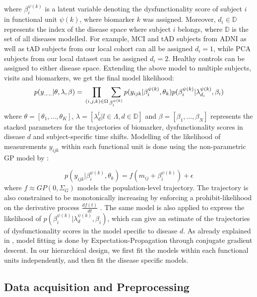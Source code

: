 \documentclass{llncs}
\begin{document}
where $\beta_i^{\psi(k)}$ is a latent variable denoting the dysfunctionality score of subject $i$ in functional unit $\psi(k)$, where biomarker $k$ was assigned. Moreover, $d_i \in \mathbb{D}$ represents the index of the disease space where subject $i$ belongs, where $\mathbb{D}$ is the set of all diseases modelled. For example, MCI and tAD subjects from ADNI as well as tAD subjects from our local cohort can all be assigned $d_i=1$, while PCA subjects from our local dataset can be assigned $d_i=2$. Healthy controls can be assigned to either disease space. Extending the above model to multiple subjects, visits and biomarkers, we get the final model likelihood:
\begin{equation}
 p(y_{.,.,.}|\theta, \lambda, \beta) = \\ \prod_{(i,j,k) \in \Omega} \sum_{\beta_i^{\psi(k)}} p(y_{ijk}| \beta_i^{\psi(k)}, \theta_k) p(\beta_i^{\psi(k)}| \lambda_{d_i}^{\psi(k)}, \beta_i)
\end{equation}
where $\theta = [\theta_1, ..., \theta_K]$, $\lambda = [\lambda_d^{l}|l \in \Lambda, d \in \mathbb{D}]$ and $\beta =[\beta_1, ..., \beta_N]$ represents the stacked parameters for the trajectories of biomarker, dysfunctionality scores in disease $d$ and subject-specific time shifts. Modelling of the likelihood of measurements $y_{ijk}$ within each functional unit is done using the non-parametric GP model by \cite{lorenzi2017disease}:

\begin{equation}
p(y_{ijk}| \beta_i^{\psi(k)}, \theta_k) = f(m_{ij} + \beta_i^{\psi(k)}) + \epsilon
\end{equation}
where $f \approx GP(0, \Sigma_G)$ models the population-level trajectory. The trajectory is also constrained to be monotonically increasing by enforcing a prohibit-likelihood on the derivative process $\frac{df(t)}{dt}$ \cite{lorenzi2017disease}. The same model is also applied to express the likelihood of $p(\beta_i^{\psi(k)}| \lambda_d^{\psi(k)}, \beta_i)$, which can give an estimate of the trajectories of dysfunctionality scores in the model specific to disease $d$. As already explained in \cite{lorenzi2017disease}, model fitting is done by Expectation-Propagation through conjugate gradient descent. In our hierarchical design, we first fit the models within each functional units independently, and then fit the disease specific models.

\subsection{Data acquisition and Preprocessing}
\end{document}
